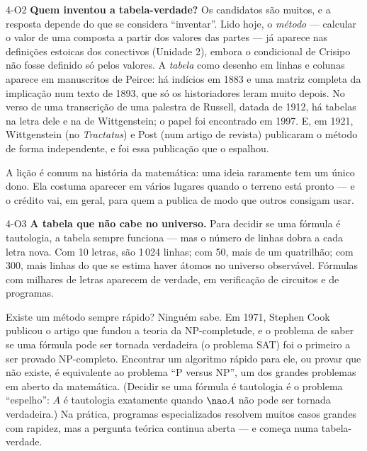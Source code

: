 \begin{obs}{4-O2}
\textbf{Quem inventou a tabela-verdade?} Os candidatos são muitos, e a resposta depende do que se considera \enquote{inventar}. Lido hoje, o \emph{método} — calcular o valor de uma composta a partir dos valores das partes — já aparece nas definições estoicas dos conectivos (Unidade 2), embora o condicional de Crisipo não fosse definido só pelos valores. A \emph{tabela} como desenho em linhas e colunas aparece em manuscritos de Peirce: há indícios em 1883 e uma matriz completa da implicação num texto de 1893, que só os historiadores leram muito depois. No verso de uma transcrição de uma palestra de Russell, datada de 1912, há tabelas na letra dele e na de Wittgenstein; o papel foi encontrado em 1997. E, em 1921, Wittgenstein (no \emph{Tractatus}) e Post (num artigo de revista) publicaram o método de forma independente, e foi essa publicação que o espalhou.

A lição é comum na história da matemática: uma ideia raramente tem um único dono. Ela costuma aparecer em vários lugares quando o terreno está pronto — e o crédito vai, em geral, para quem a publica de modo que outros consigam usar.
\end{obs}

\begin{obs}{4-O3}
\textbf{A tabela que não cabe no universo.} Para decidir se uma fórmula é tautologia, a tabela sempre funciona — mas o número de linhas dobra a cada letra nova. Com 10 letras, são 1\,024 linhas; com 50, mais de um quatrilhão; com 300, mais linhas do que se estima haver átomos no universo observável. Fórmulas com milhares de letras aparecem de verdade, em verificação de circuitos e de programas.

Existe um método sempre rápido? Ninguém sabe. Em 1971, Stephen Cook publicou o artigo que fundou a teoria da NP-completude, e o problema de saber se uma fórmula pode ser tornada verdadeira (o problema SAT) foi o primeiro a ser provado NP-completo. Encontrar um algoritmo rápido para ele, ou provar que não existe, é equivalente ao problema \enquote{P versus NP}, um dos grandes problemas em aberto da matemática. (Decidir se uma fórmula é tautologia é o problema \enquote{espelho}: $A$ é tautologia exatamente quando ${\nao}A$ não pode ser tornada verdadeira.) Na prática, programas especializados resolvem muitos casos grandes com rapidez, mas a pergunta teórica continua aberta — e começa numa tabela-verdade.
\end{obs}

